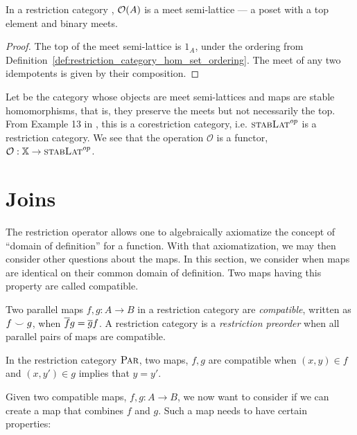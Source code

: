 \begin{lemma}\label{lem:open_a_is_a_meet_semilattice}
  In a restriction category \X, $\mathcal{O}({A})$ is a meet semi-lattice --- a poset with a top element and
  binary meets.
\end{lemma}
\begin{proof}
  The top of the meet semi-lattice is $1_A$, under the ordering from
  Definition~\ref{def:restriction_category_hom_set_ordering}.
  The meet of any two idempotents is given by their composition.
\end{proof}

Let \stabLat be the category whose objects are meet semi-lattices and maps are stable homomorphisms,
that is, they preserve the meets but not necessarily the top. From Example 13 in
\cite{cockett2002:restcategories1}, this is a corestriction category, i.e. ${\textsc{stabLat}}^{op}$ is a
restriction category. We see that the operation $\mathcal{O}$ is a functor, $\mathcal{O}: \mathbb{X} \to
{\textsc{stabLat}}^{op}$.

\section{Joins} %
\label{sub:joins_in_restriction_categories}

The restriction operator allows one to algebraically axiomatize the concept of ``domain of definition''
for a function. With that axiomatization, we may then consider other questions about the maps. In
this section, we consider when maps are identical on their common domain of definition. Two maps
having this property are called compatible.

\begin{definition}\label{def:compatible_maps}
  Two parallel maps $f,g:A \to B$ in a restriction category are \emph{compatible}, written as $f
  \smile g$, when $\overline{f} g = \overline{g} f$.  A restriction category \X is a \emph{restriction
    preorder} when all parallel pairs of maps are compatible.
\end{definition}

\begin{example}\label{ex:compatibility_in_par}
In the restriction category $\textsc{Par}$, two maps, $f, g$ are compatible when
$(x,y) \in f$ and $(x,y')\in g$ implies that $y = y'$.
\end{example}

Given two compatible maps, $f,g:A\to B$, we now want to consider if we can create a map that
combines $f$ and $g$. Such a map needs to have certain properties:

